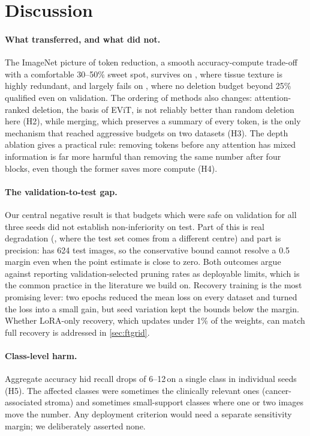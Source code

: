 \section{Discussion}
\label{sec:discussion}

\paragraph{What transferred, and what did not.}
The ImageNet picture of token reduction, a smooth accuracy-compute trade-off with a comfortable 30--50\% sweet spot, survives on \pathmnist, where tissue texture is highly redundant, and largely fails on \dermamnist, where no deletion budget beyond 25\% qualified even on validation. The ordering of methods also changes: attention-ranked deletion, the basis of EViT, is not reliably better than random deletion here (H2), while merging, which preserves a summary of every token, is the only mechanism that reached aggressive budgets on two datasets (H3). The depth ablation gives a practical rule: removing tokens before any attention has mixed information is far more harmful than removing the same number after four blocks, even though the former saves more compute (H4).

\paragraph{The validation-to-test gap.}
Our central negative result is that budgets which were safe on validation for all three seeds did not establish non-inferiority on test. Part of this is real degradation (\pathmnist, where the test set comes from a different centre) and part is precision: \pneumnist has 624 test images, so the conservative bound cannot resolve a 0.5\,\pp margin even when the point estimate is close to zero. Both outcomes argue against reporting validation-selected pruning rates as deployable limits, which is the common practice in the literature we build on. Recovery training is the most promising lever: two epochs reduced the mean loss on every dataset and turned the \pathmnist loss into a small gain, but seed variation kept the bounds below the margin. Whether LoRA-only recovery, which updates under 1\% of the weights, can match full recovery is addressed in \cref{sec:ftgrid}. 

\paragraph{Class-level harm.}
Aggregate accuracy hid recall drops of 6--12\,\pp on a single class in individual seeds (H5). The affected classes were sometimes the clinically relevant ones (cancer-associated stroma) and sometimes small-support classes where one or two images move the number. Any deployment criterion would need a separate sensitivity margin; we deliberately asserted none.

